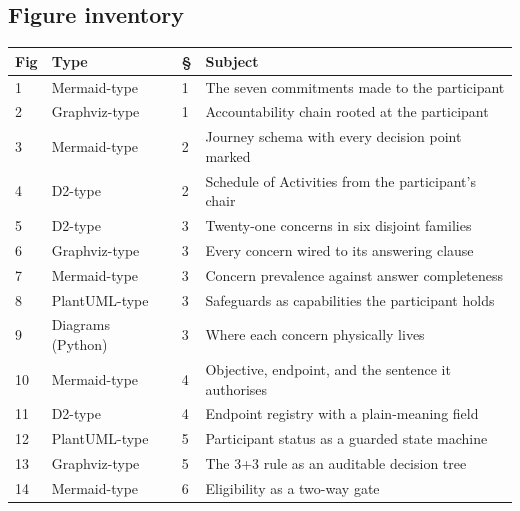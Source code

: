 
\subsection{Figure inventory}


\vspace{0.30em}

\noindent\begin{tabularx}{\textwidth}{C{1.0cm} L{3.6cm} C{1.2cm} Y}
\toprule
\textbf{Fig} & \textbf{Type} & \textbf{\S} & \textbf{Subject} \\
 & Mermaid-type & 1 & The seven commitments made to the participant \\
2 & Graphviz-type & 1 & Accountability chain rooted at the participant \\
3 & Mermaid-type & 2 & Journey schema with every decision point marked \\
4 & D2-type & 2 & Schedule of Activities from the participant's chair \\
5 & D2-type & 3 & Twenty-one concerns in six disjoint families \\
6 & Graphviz-type & 3 & Every concern wired to its answering clause \\
7 & Mermaid-type & 3 & Concern prevalence against answer completeness \\
8 & PlantUML-type & 3 & Safeguards as capabilities the participant holds \\
9 & Diagrams (Python) & 3 & Where each concern physically lives \\
10 & Mermaid-type & 4 & Objective, endpoint, and the sentence it authorises \\
11 & D2-type & 4 & Endpoint registry with a plain-meaning field \\
12 & PlantUML-type & 5 & Participant status as a guarded state machine \\
13 & Graphviz-type & 5 & The 3+3 rule as an auditable decision tree \\
14 & Mermaid-type & 6 & Eligibility as a two-way gate \\

\end{tabularx}
